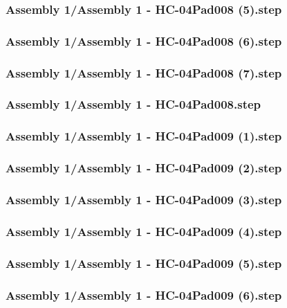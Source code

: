 \documentclass[a4paper,12pt]{article}
\begin{document}
\begin{lstlising}[language=C++]
\subsubsection{Assembly 1/Assembly 1 - HC-04Pad008 (5).step}

\subsubsection{Assembly 1/Assembly 1 - HC-04Pad008 (6).step}

\subsubsection{Assembly 1/Assembly 1 - HC-04Pad008 (7).step}

\subsubsection{Assembly 1/Assembly 1 - HC-04Pad008.step}

\subsubsection{Assembly 1/Assembly 1 - HC-04Pad009 (1).step}

\subsubsection{Assembly 1/Assembly 1 - HC-04Pad009 (2).step}

\subsubsection{Assembly 1/Assembly 1 - HC-04Pad009 (3).step}

\subsubsection{Assembly 1/Assembly 1 - HC-04Pad009 (4).step}

\subsubsection{Assembly 1/Assembly 1 - HC-04Pad009 (5).step}

\subsubsection{Assembly 1/Assembly 1 - HC-04Pad009 (6).step}


\end{lstlising}
\end{document}

